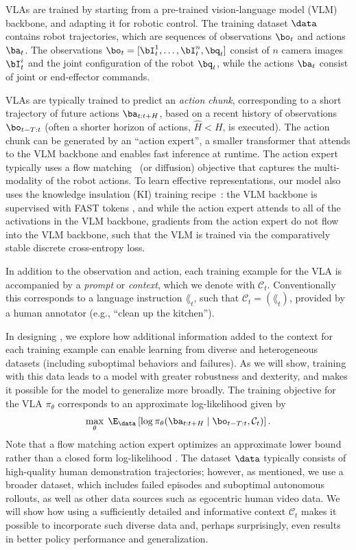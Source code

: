 
\label{sec:prelim}

VLAs are trained by starting from a pre-trained vision-language model (VLM) backbone, and adapting it for robotic control. The training dataset $\data$ contains robot trajectories, which are sequences of observations $\bo_t$ and actions $\ba_t$. The observations $\bo_t = [\bI_t^1, \ldots, \bI_t^n, \bq_t]$ consist of $n$ camera images $\bI_t^i$ and the joint configuration of the robot $\bq_t$, while the actions $\ba_t$ consist of joint or end-effector commands. 

VLAs are typically trained to predict an \emph{action chunk}, corresponding to a short trajectory of future actions $\ba_{t:t+H}$, based on a recent history of observations $\bo_{t-T:t}$ (often a shorter horizon of actions, $\hat{H} < H$, is executed).
The action chunk can be generated by an ``action expert'', a smaller transformer that attends to the VLM backbone and enables fast inference at runtime. The action expert typically uses a flow matching~\citep{lipman2022flow} (or diffusion) objective that captures the multi-modality of the robot actions. To learn effective representations, our model also uses the knowledge insulation (KI) training recipe~\cite{driess2025knowledge}: the VLM backbone is supervised with FAST tokens \cite{pertsch2025fast}, and while the action expert attends to all of the activations in the VLM backbone, gradients from the action expert do not flow into the VLM backbone, such that the VLM is trained via the comparatively stable discrete cross-entropy loss.

In addition to the observation and action, each training example for the VLA is accompanied by 
a \emph{prompt} or 
\emph{context}, which we denote with $\mathcal{C}_t$. Conventionally this corresponds to a language instruction $\lang_t$, such that $\mathcal{C}_t = (\lang_t)$, provided by a human annotator (e.g., ``clean up the kitchen'').

In designing \MethodName{}, we explore how additional information added to the context for each training example can enable learning from diverse and heterogeneous datasets (including suboptimal behaviors and failures). As we will show, training with this data leads to a model with greater robustness and dexterity, and makes it possible for the model to generalize more broadly. The training objective for the VLA $\pi_\theta$ corresponds to an approximate log-likelihood given by
\begin{equation}
\max_{\theta} \; \E_{\data}
\left[\log \pi_{\theta}(\ba_{t:t+H} \mid \bo_{t-T:t}, \mathcal{C}_t)\right].
\label{eq:vla_il}
\end{equation}
Note that a flow matching action expert optimizes an approximate lower bound rather than a closed form log-likelihood \cite{black2024pi_0}. The dataset $\data$ typically consists of high-quality human demonstration trajectories; however, as mentioned, we use a broader dataset, which includes failed episodes and suboptimal autonomous rollouts, as well as other data sources such as egocentric human video data. We will show how using a sufficiently detailed and informative context $\mathcal{C}_t$ makes it possible to incorporate such diverse data and, perhaps surprisingly, even results in better policy performance and generalization.


